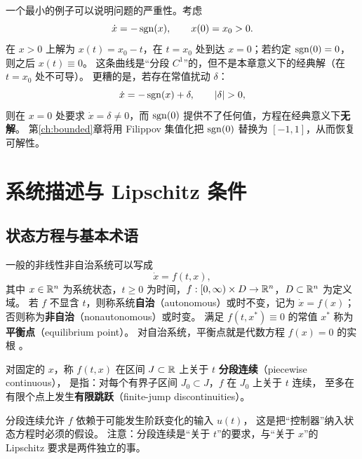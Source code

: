 一个最小的例子可以说明问题的严重性。考虑
\begin{equation}\label{eq:minimal-sgn}
  \dot x = -\operatorname{sgn}(x),\qquad x(0)=x_0>0 .
\end{equation}
在 $x>0$ 上解为 $x(t)=x_0-t$，在 $t=x_0$ 处到达 $x=0$；若约定 $\operatorname{sgn}(0)=0$，则之后 $x(t)\equiv 0$。
这条曲线是“分段 $C^1$”的，但不是本章意义下的经典解（在 $t=x_0$ 处不可导）。
更糟的是，若存在常值扰动 $\delta$：
\begin{equation}\label{eq:minimal-sgn-dist}
  \dot x = -\sgn{x}+\delta,\qquad |\delta|>0,
\end{equation}
则在 $x=0$ 处要求 $\dot x=\delta\ne 0$，而 $\operatorname{sgn}(0)$ 提供不了任何值，方程在经典意义下\textbf{无解}。
第\ref{ch:bounded}章将用 Filippov 集值化把 $\operatorname{sgn}(0)$ 替换为 $[-1,1]$，从而恢复可解性。

\section{系统描述与 Lipschitz 条件}\label{sec:lipschitz-def}

\subsection{状态方程与基本术语}

一般的非线性非自治系统可以写成
\begin{equation}\label{eq:nonlinear}
    \dot{x}=f(t,x),
\end{equation}
其中 $x\in\mathbb{R}^n$ 为系统状态，$t\geq 0$ 为时间，$f:[0,\infty)\times D\to\mathbb{R}^n$，$D\subset\mathbb{R}^n$ 为定义域。
若 $f$ 不显含 $t$，则称系统\textbf{自治}（autonomous）或时不变，记为 $\dot x=f(x)$；
否则称为\textbf{非自治}（nonautonomous）或时变。
满足 $f(t,x^\ast)\equiv 0$ 的常值 $x^\ast$ 称为\textbf{平衡点}（equilibrium point）。
对自治系统，平衡点就是代数方程 $f(x)=0$ 的实根 \cite[§1.1]{khalilNonlinearControl2015}。

\begin{definition}[关于 $t$ 分段连续]\label{def:piecewise-continuous}
  对固定的 $x$，称 $f(t,x)$ 在区间 $J\subset\mathbb{R}$ 上关于 $t$ \textbf{分段连续}（piecewise continuous），
  是指：对每个有界子区间 $J_0\subset J$，$f$ 在 $J_0$ 上关于 $t$ 连续，
  至多在有限个点上发生\textbf{有限跳跃}（finite-jump discontinuities）。
\end{definition}

分段连续允许 $f$ 依赖于可能发生阶跃变化的输入 $u(t)$，
这是把“控制器”纳入状态方程时必须的假设。
注意：分段连续是“关于 $t$”的要求，与“关于 $x$”的 Lipschitz 要求是两件独立的事。

